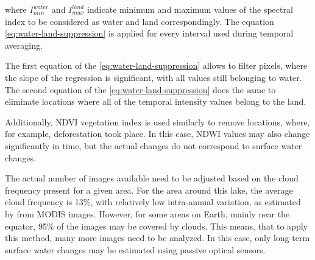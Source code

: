 where $I_{min}^{water}$ and $I_{max}^{land}$ indicate minimum and maximum values of the spectral index to be considered as water and land correspondingly. The equation \ref{eq:water-land-suppression} is applied for every interval used during temporal averaging.

The first equation of the \ref{eq:water-land-suppression} allows to filter pixels, where the slope of the regression is significant, with all values still belonging to water. The second equation of the \ref{eq:water-land-suppression} does the same to eliminate locations where all of the temporal intensity values belong to the land.

Additionally, \gls{NDVI} vegetation index is used similarly to remove locations, where, for example, deforestation took place. In this case, \gls{NDWI} values may also change significantly in time, but the actual changes do not correspond to surface water changes.


The actual number of images available need to be adjusted based on the cloud frequency present for a given area. For the area around this lake, the average cloud frequency is 13\%, with relatively low intra-annual variation, as estimated by \citet{wilson2016remotely} from MODIS images. However, for some areas on Earth, mainly near the equator, 95\% of the images may be covered by clouds. This means, that to apply this method, many more images need to be analyzed. In this case, only long-term surface water changes may be estimated using passive optical sensors. 

